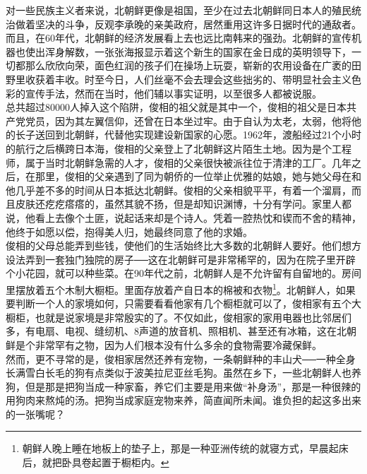 对一些民族主义者来说，北朝鲜更像是祖国，至少在过去北朝鲜同日本人的殖民统治做着坚决的斗争，反观李承晚的亲美政府，居然重用这许多日据时代的通敌者。而且，在60年代，北朝鲜的经济发展看上去也远比南韩来的强劲。北朝鲜的宣传机器也使出浑身解数，一张张海报显示着这个新生的国家在金日成的英明领导下，一切都那么欣欣向荣，面色红润的孩子们在操场上玩耍，崭新的农用设备在广袤的田野里收获着丰收。时至今日，人们丝毫不会去理会这些拙劣的、带明显社会主义色彩的宣传手法，然而在当时，他们辅以事实证明，以至很多人都被说服。\\

总共超过80000人掉入这个陷阱，俊相的祖父就是其中一个，俊相的祖父是日本共产党党员，因为其左翼信仰，还曾在日本坐过牢。由于自认为太老，太弱，他将他的长子送回到北朝鲜，代替他实现建设新国家的心愿。1962年，渡船经过21个小时的航行之后横跨日本海，俊相的父亲登上了北朝鲜这片陌生土地。因为是个工程师，属于当时北朝鲜急需的人才，俊相的父亲很快被派往位于清津的工厂。几年之后，在那里，俊相的父亲遇到了同为朝侨的一位举止优雅的姑娘，她与她父母在和他几乎差不多的时间从日本抵达北朝鲜。俊相的父亲相貌平平，有着一个溜肩，而且皮肤还疙疙瘩瘩的，虽然其貌不扬，但是却知识渊博，十分有学问。家里人都说，他看上去像个土匪，说起话来却是个诗人。凭着一腔热忱和锲而不舍的精神，他终于如愿以偿，抱得美人归，她最终同意了他的求婚。\\

俊相的父母总能弄到些钱，使他们的生活始终比大多数的北朝鲜人要好。他们想方设法弄到一套独门独院的房子──这在北朝鲜可是非常稀罕的，因为在院子里开辟个小花园，就可以种些菜。在90年代之前，北朝鲜人是不允许留有自留地的。房间里摆放着五个木制大橱柜。里面存放着产自日本的棉被和衣物\footnote{朝鲜人晚上睡在地板上的垫子上，那是一种亚洲传统的就寝方式，早晨起床后，就把卧具卷起置于橱柜内。}。北朝鲜人，如果要判断一个人的家境如何，只需要看看他家有几个橱柜就可以了，俊相家有五个大橱柜，也就是说家境是非常殷实的了。不仅如此，俊相家的家用电器也比邻居们多，有电扇、电视、缝纫机、8声道的放音机、照相机、甚至还有冰箱，这在北朝鲜是个非常罕有之物，因为人们根本没有什么多余的食物需要冷藏保鲜。\\

然而，更不寻常的是，俊相家居然还养有宠物，一条朝鲜种的丰山犬──一种全身长满雪白长毛的狗有点类似于波美拉尼亚丝毛狗。虽然在乡下，一些北朝鲜人也养狗，但是那是把狗当成一种家畜，养它们主要是用来做“补身汤”，那是一种很辣的用狗肉来熬炖的汤。把狗当成家庭宠物来养，简直闻所未闻。谁负担的起这多出来的一张嘴呢？\\

